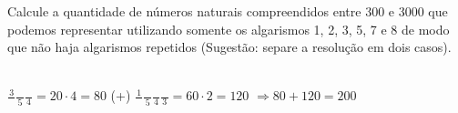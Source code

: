 \begin{ex}
Calcule a quantidade de números naturais compreendidos entre 300 e 3000 que podemos representar utilizando somente os algarismos 1, 2, 3, 5, 7 e 8 de modo que não haja algarismos repetidos (Sugestão: separe a resolução em dois casos).
  \begin{sol}
    \phantom{A} \\
    $\frac{3}{\phantom{A}}\frac{\phantom{A}}{5}\frac{\phantom{A}}{4}=20\cdot4=80$ \hspace{0,6cm} (+)\hspace{0,6cm}
    $\frac{1}{\phantom{A}}\frac{\phantom{A}}{5}\frac{\phantom{A}}{4}\frac{\phantom{A}}{3}=  60\cdot2=120$ \hspace{0,3cm}
    $\Longrightarrow 80 +120=200$
  \end{sol}
\end{ex}
